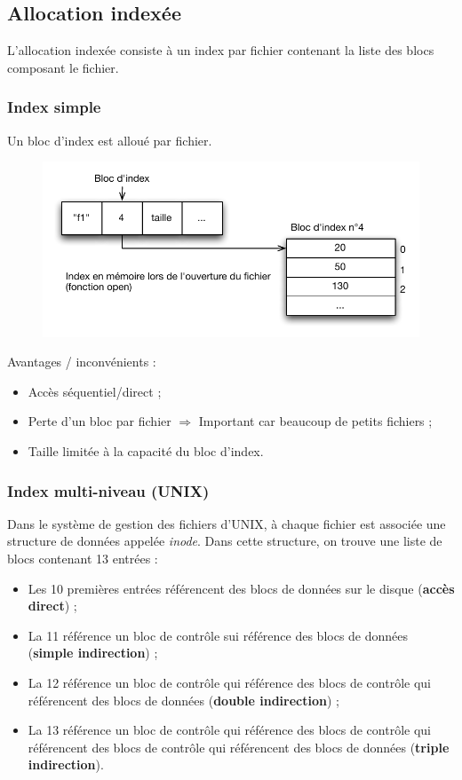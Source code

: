 \documentclass[11pt,english,french]{scrreprt}
\theoremstyle{remark}
\theoremstyle{definition}
\newcommand*\Pitem{%
  \item[\color{green}\scalebox{0.9}{\textbullet}]}
\newcommand*\Citem{%
  \item[\color{red}\scalebox{0.9}{\textbullet}]}
\begin{document}
\subsection{Allocation indexée}
L'allocation indexée consiste à un index par fichier contenant la liste des blocs composant le fichier.

\subsubsection{Index simple}
Un bloc d'index est alloué par fichier.

\begin{figure}[h!]
	\center
	\vspace{-20pt}
	\includegraphics[scale=.85]{img/allocation-indexee}
	\vspace{-20pt}
\end{figure}

Avantages / inconvénients :
\begin{itemize}
	\Pitem Accès séquentiel/direct ;
	\Citem Perte d'un bloc par fichier $\Rightarrow$ Important car beaucoup de petits fichiers ;
	\Citem Taille limitée à la capacité du bloc d'index. 
\end{itemize}

\subsubsection{Index multi-niveau (UNIX)}

Dans le système de gestion des fichiers d'UNIX, à chaque fichier est associée une structure de données appelée \emph{inode}. Dans cette structure, on trouve une liste de blocs contenant 13 entrées :\begin{itemize}
	\item Les 10 premières entrées référencent des blocs de données sur le disque (\textbf{accès direct}) ;
	\item La 11 référence un bloc de contrôle sui référence des blocs de données (\textbf{simple indirection}) ;
	\item La 12 référence un bloc de contrôle qui référence des blocs de contrôle qui référencent des blocs de données (\textbf{double indirection}) ;
	\item La 13 référence un bloc de contrôle qui référence des blocs de contrôle qui référencent des blocs de contrôle qui référencent des blocs de données (\textbf{triple indirection}).
\end{itemize}
\end{document}
